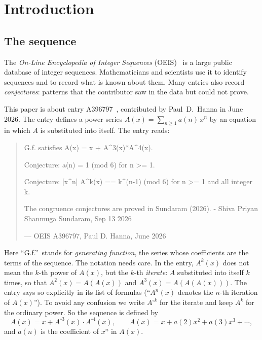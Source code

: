 \documentclass[11pt,a4paper]{article}
\theoremstyle{definition}
\theoremstyle{remark}
\begin{document}
\section{Introduction}

\subsection{The sequence}\label{sec:sequence}
The \emph{On-Line Encyclopedia of Integer Sequences} (OEIS)~\cite{oeisdb} is a large public database of integer
sequences. Mathematicians and scientists use it to identify sequences and to record what is known about them. Many
entries also record \emph{conjectures}: patterns that the contributor saw in the data but could not prove.

This paper is about entry A396797~\cite{oeis}, contributed by Paul~D.~Hanna in June 2026.
The entry defines a power series $A(x)=\sum_{n\ge1}a(n)\,x^n$ by an equation in which $A$ is substituted into
itself. The entry reads:
\begin{quote}\small\ttfamily\raggedright G.f. satisfies A(x) = x + A\^{}3(x)*A\^{}4(x).\par\smallskip Conjecture: a(n) = 1 (mod 6) for n >= 1.\par\smallskip Conjecture: [x\^{}n] A\^{}k(x) == k\^{}(n-1) (mod 6) for n >= 1 and all integer k.\par\smallskip The congruence conjectures are proved in Sundaram (2026). - Shiva Priyan Shanmuga Sundaram, Sep 13 2026\par\smallskip\hfill\textrm{--- OEIS A396797, Paul D. Hanna, June 2026}\end{quote}

Here ``G.f.''\ stands for \emph{generating function}, the series whose coefficients are the terms of the sequence.
The notation needs care. In the entry, $A^k(x)$ does not mean the $k$-th power of $A(x)$, but the $k$-th
\emph{iterate}: $A$ substituted into itself $k$ times, so that $A^2(x)=A(A(x))$ and $A^3(x)=A(A(A(x)))$. The entry
says so explicitly in its list of formulas (``$A^n(x)$ denotes the $n$-th iteration of $A(x)$''). To avoid any
confusion we write $A^{\circ k}$ for the iterate and keep $A^k$ for the ordinary power. So the sequence is defined by
\begin{equation}\label{eq:def}
A(x)=x+A^{\circ3}(x)\cdot A^{\circ4}(x),\qquad A(x)=x+a(2)x^2+a(3)x^3+\cdots,
\end{equation}
and $a(n)$ is the coefficient of $x^n$ in $A(x)$.
\end{document}
